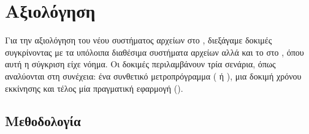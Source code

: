 \chapter{Αξιολόγηση}

Για την αξιολόγηση του νέου συστήματος αρχείων στο \osv{}, διεξάγαμε δοκιμές
συγκρίνοντας με τα υπόλοιπα διαθέσιμα συστήματα αρχείων αλλά και το
\viofs{} στο \linux{}, όπου αυτή η σύγκριση είχε νόημα. Οι δοκιμές περιλαμβάνουν
τρία σενάρια, όπως αναλύονται στη συνέχεια: ένα συνθετικό μετροπρόγραμμα
( ή ), μια δοκιμή χρόνου εκκίνησης
και τέλος μία πραγματική εφαρμογή ().

\section{Μεθοδολογία}

